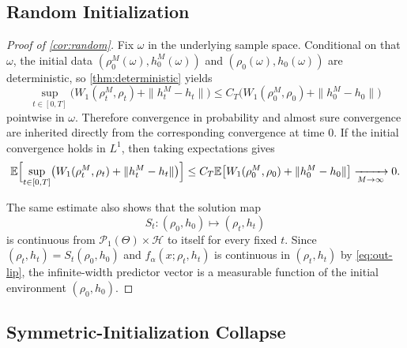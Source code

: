 \documentclass[11pt]{article}
\theoremstyle{definition}
\newcommand{\E}{\mathbb{E}}
\newcommand{\PP}{\mathcal{P}}
\newcommand{\W}{W_1}
\begin{document}
\subsection{Random Initialization}

\begin{proof}[Proof of \cref{cor:random}]
Fix $\omega$ in the underlying sample space. Conditional on that $\omega$, the
initial data $(\rho_0^M(\omega),h_0^M(\omega))$ and $(\rho_0(\omega),h_0(\omega))$
are deterministic, so \cref{thm:deterministic} yields
\[
  \sup_{t\in[0,T]}
  \bigl(
    \W(\rho_t^M,\rho_t)+\|h_t^M-h_t\|
  \bigr)
  \le
  C_T
  \bigl(
    \W(\rho_0^M,\rho_0)+\|h_0^M-h_0\|
  \bigr)
\]
pointwise in $\omega$.
Therefore convergence in probability and almost sure convergence are inherited
directly from the corresponding convergence at time $0$. If the initial
convergence holds in $L^1$, then taking expectations gives
\[
  \E\Bigl[
    \sup_{t\in[0,T]}
    \bigl(
      \W(\rho_t^M,\rho_t)+\|h_t^M-h_t\|
    \bigr)
  \Bigr]
  \le
  C_T
  \E\bigl[
    \W(\rho_0^M,\rho_0)+\|h_0^M-h_0\|
  \bigr]
  \xrightarrow[M\to\infty]{}0.
\]

The same estimate also shows that the solution map
\[
  S_t:(\rho_0,h_0)\mapsto(\rho_t,h_t)
\]
is continuous from $\PP_1(\Theta)\times\mathcal H$ to itself for every fixed
$t$. Since $(\rho_t,h_t)=S_t(\rho_0,h_0)$ and
\(
  f_\alpha(x;\rho_t,h_t)
\)
is continuous in $(\rho_t,h_t)$ by \eqref{eq:out-lip}, the infinite-width
predictor vector is a measurable function of the initial environment
$(\rho_0,h_0)$.
\end{proof}

\subsection{Symmetric-Initialization Collapse}
\end{document}
